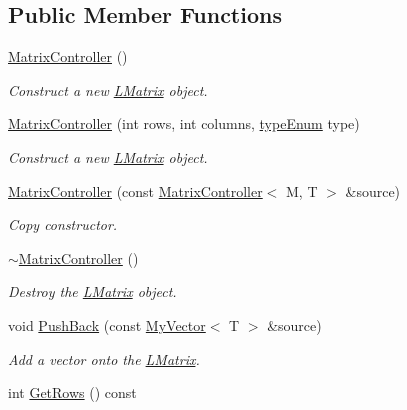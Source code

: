\subsection*{Public Member Functions}
\begin{DoxyCompactItemize}
\item 
\mbox{\hyperlink{class_matrix_controller_ad3e161e9dfa785fc9e9007b12d79a834}{Matrix\+Controller}} ()
\begin{DoxyCompactList}\small\item\em Construct a new \mbox{\hyperlink{class_l_matrix}{L\+Matrix}} object. \end{DoxyCompactList}\item 
\mbox{\hyperlink{class_matrix_controller_adf5ba28c2f4fe911479ccccf8381823d}{Matrix\+Controller}} (int rows, int columns, \mbox{\hyperlink{class_matrix_controller_aca66836084cbc7807dbaea879ac31fc7}{type\+Enum}} type)
\begin{DoxyCompactList}\small\item\em Construct a new \mbox{\hyperlink{class_l_matrix}{L\+Matrix}} object. \end{DoxyCompactList}\item 
\mbox{\hyperlink{class_matrix_controller_a2a97e643dacd9162bb88c680c7169f5c}{Matrix\+Controller}} (const \mbox{\hyperlink{class_matrix_controller}{Matrix\+Controller}}$<$ M, T $>$ \&source)
\begin{DoxyCompactList}\small\item\em Copy constructor. \end{DoxyCompactList}\item 
\mbox{\hyperlink{class_matrix_controller_ac3e8818bb538155c6cb7a46a9ec92ece}{$\sim$\+Matrix\+Controller}} ()
\begin{DoxyCompactList}\small\item\em Destroy the \mbox{\hyperlink{class_l_matrix}{L\+Matrix}} object. \end{DoxyCompactList}\item 
void \mbox{\hyperlink{class_matrix_controller_a5f5411f7f84c53bb02b4f4febb3c4089}{Push\+Back}} (const \mbox{\hyperlink{class_my_vector}{My\+Vector}}$<$ T $>$ \&source)
\begin{DoxyCompactList}\small\item\em Add a vector onto the \mbox{\hyperlink{class_l_matrix}{L\+Matrix}}. \end{DoxyCompactList}\item 
int \mbox{\hyperlink{class_matrix_controller_a3cf741ea77589aae6557b691f4e4c3bb}{Get\+Rows}} () const

\end{DoxyCompactItemize}
